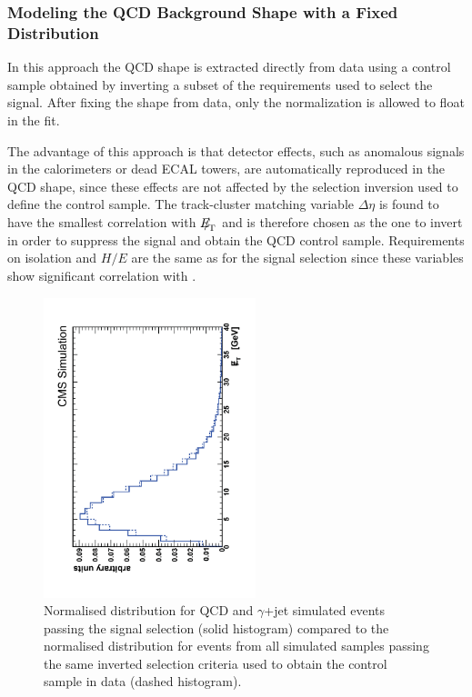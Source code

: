 \subsubsection{Modeling the QCD Background Shape with a Fixed Distribution}
\label{sec:e-Wsigextr-FixedTemplate}

In this approach the QCD shape is extracted directly from data using a 
control sample obtained by inverting a subset of the requirements used to select the 
signal. After fixing the shape from data,
only the normalization is allowed to float in the fit.  

The advantage of this approach 
is that detector effects, such as anomalous signals in the ca\-lo\-ri\-me\-ters or 
dead ECAL towers, are automatically reproduced in the QCD shape, since these 
effects are not affected by the selection inversion used to define the control sample.
The track-cluster matching variable $\Delta\eta$ is found
to have the smallest correlation with ${E\!\!\!/}_{\!\mathrm{T}}$ and is therefore chosen as the one 
to invert in order to suppress the signal and obtain the QCD control sample.  
Requirements on isolation and $H/E$ are the same as for the signal 
selection since these variables show significant correlation with \MET. 
\begin{figure}[h!]
  \begin{center}
    \includegraphics*[angle=-90,width=0.55\textwidth]{figs/antiselShape.pdf}
    \caption{Normalised \MET distribution for QCD and $\gamma$+jet simulated 
events passing the signal selection (solid histogram) compared 
to the normalised distribution for events from all simulated samples passing
the same inverted selection criteria used to obtain the control sample in data
(dashed histogram).}
    \label{fig:antiselShape}
  \end{center}
\end{figure}

